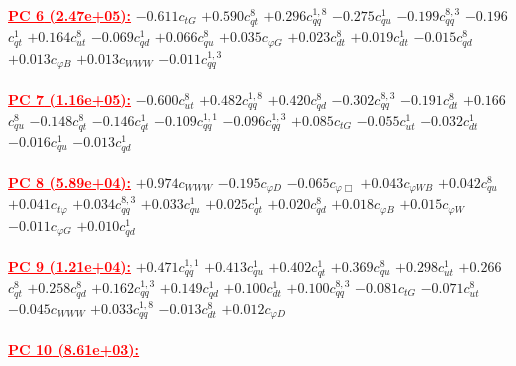 \documentclass{article}
\begin{document}
\noindent \textcolor{red}{\underline{\bf{PC 6} (2.47e+05):}}
{$-0.611$}{\rm $c_{tG}$} 
{$+0.590$}{\rm $c_{qt}^{8}$} 
{$+0.296$}{\rm $c_{qq}^{1,8}$} 
{$-0.275$}{\rm $c_{qu}^{1}$} 
{$-0.199$}{\rm $c_{qq}^{8,3}$} 
{$-0.196$}{\rm $c_{qt}^{1}$} 
{$+0.164$}{\rm $c_{ut}^{8}$} 
{$-0.069$}{\rm $c_{qd}^{1}$} 
{$+0.066$}{\rm $c_{qu}^{8}$} 
{$+0.035$}{\rm $c_{\varphi G}$} 
{$+0.023$}{\rm $c_{dt}^{8}$} 
{$+0.019$}{\rm $c_{dt}^{1}$} 
{$-0.015$}{\rm $c_{qd}^{8}$} 
{$+0.013$}{\rm $c_{\varphi B}$} 
{$+0.013$}{\rm $c_{WWW}$} 
{$-0.011$}{\rm $c_{qq}^{1,3}$} 
 \nonumber \\ \nonumber \\ 
\noindent \textcolor{red}{\underline{\bf{PC 7} (1.16e+05):}}
{$-0.600$}{\rm $c_{ut}^{8}$} 
{$+0.482$}{\rm $c_{qq}^{1,8}$} 
{$+0.420$}{\rm $c_{qd}^{8}$} 
{$-0.302$}{\rm $c_{qq}^{8,3}$} 
{$-0.191$}{\rm $c_{dt}^{8}$} 
{$+0.166$}{\rm $c_{qu}^{8}$} 
{$-0.148$}{\rm $c_{qt}^{8}$} 
{$-0.146$}{\rm $c_{qt}^{1}$} 
{$-0.109$}{\rm $c_{qq}^{1,1}$} 
{$-0.096$}{\rm $c_{qq}^{1,3}$} 
{$+0.085$}{\rm $c_{tG}$} 
{$-0.055$}{\rm $c_{ut}^{1}$} 
{$-0.032$}{\rm $c_{dt}^{1}$} 
{$-0.016$}{\rm $c_{qu}^{1}$} 
{$-0.013$}{\rm $c_{qd}^{1}$} 
 \nonumber \\ \nonumber \\ 
\noindent \textcolor{red}{\underline{\bf{PC 8} (5.89e+04):}}
{$+0.974$}{\rm $c_{WWW}$} 
{$-0.195$}{\rm $c_{\varphi D}$} 
{$-0.065$}{\rm $c_{\varphi \Box}$} 
{$+0.043$}{\rm $c_{\varphi WB}$} 
{$+0.042$}{\rm $c_{qu}^{8}$} 
{$+0.041$}{\rm $c_{t \varphi}$} 
{$+0.034$}{\rm $c_{qq}^{8,3}$} 
{$+0.033$}{\rm $c_{qu}^{1}$} 
{$+0.025$}{\rm $c_{qt}^{1}$} 
{$+0.020$}{\rm $c_{qd}^{8}$} 
{$+0.018$}{\rm $c_{\varphi B}$} 
{$+0.015$}{\rm $c_{\varphi W}$} 
{$-0.011$}{\rm $c_{\varphi G}$} 
{$+0.010$}{\rm $c_{qd}^{1}$} 
 \nonumber \\ \nonumber \\ 
\noindent \textcolor{red}{\underline{\bf{PC 9} (1.21e+04):}}
{$+0.471$}{\rm $c_{qq}^{1,1}$} 
{$+0.413$}{\rm $c_{qu}^{1}$} 
{$+0.402$}{\rm $c_{qt}^{1}$} 
{$+0.369$}{\rm $c_{qu}^{8}$} 
{$+0.298$}{\rm $c_{ut}^{1}$} 
{$+0.266$}{\rm $c_{qt}^{8}$} 
{$+0.258$}{\rm $c_{qd}^{8}$} 
{$+0.162$}{\rm $c_{qq}^{1,3}$} 
{$+0.149$}{\rm $c_{qd}^{1}$} 
{$+0.100$}{\rm $c_{dt}^{1}$} 
{$+0.100$}{\rm $c_{qq}^{8,3}$} 
{$-0.081$}{\rm $c_{tG}$} 
{$-0.071$}{\rm $c_{ut}^{8}$} 
{$-0.045$}{\rm $c_{WWW}$} 
{$+0.033$}{\rm $c_{qq}^{1,8}$} 
{$-0.013$}{\rm $c_{dt}^{8}$} 
{$+0.012$}{\rm $c_{\varphi D}$} 
 \nonumber \\ \nonumber \\ 
\noindent \textcolor{red}{\underline{\bf{PC 10} (8.61e+03):}}
\end{document}
